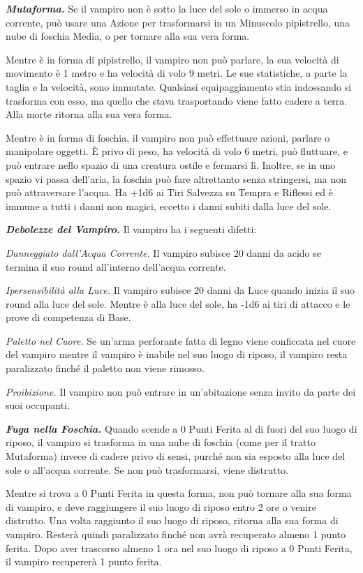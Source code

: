 \begin{multicols}{2}
{\emph{\textbf{Mutaforma.}} Se il vampiro non è sotto la luce del sole o immerso in acqua corrente, può usare una Azione per trasformarsi in un Minuscolo pipistrello, una nube di foschia Media, o per tornare alla sua vera forma.

Mentre è in forma di pipistrello, il vampiro non può parlare, la sua velocità di movimento è 1 metro e ha velocità di volo 9 metri. Le sue statistiche, a parte la taglia e la velocità, sono immutate. Qualsiasi equipaggiamento stia indossando si trasforma con esso, ma quello che stava trasportando viene fatto cadere a terra. Alla morte ritorna alla sua vera forma.

Mentre è in forma di foschia, il vampiro non può effettuare azioni, parlare o manipolare oggetti. È privo di peso, ha velocità di volo 6 metri, può fluttuare, e può entrare nello spazio di una creatura ostile e fermarsi lì. Inoltre, se in uno spazio vi passa dell'aria, la foschia può fare altrettanto senza stringersi, ma non può attraversare l'acqua. Ha +1d6 ai Tiri Salvezza su Tempra e Riflessi ed è immune a tutti i danni non magici, eccetto i danni subiti dalla luce del
sole.

\emph{\textbf{Debolezze del Vampiro.}} Il vampiro ha i seguenti difetti:

\emph{Danneggiato dall'Acqua Corrente.} Il vampiro subisce 20 danni da acido se termina il suo round all'interno dell'acqua corrente.

\emph{Ipersensibilità alla Luce.} Il vampiro subisce 20 danni da Luce quando inizia il suo round alla luce del sole. Mentre è alla luce del sole, ha -1d6 ai tiri di attacco e le prove di competenza di Base.

\emph{Paletto nel Cuore.} Se un'arma perforante fatta di legno viene conficcata nel cuore del vampiro mentre il vampiro è inabile nel suo luogo di riposo, il vampiro resta paralizzato finché il paletto non viene rimosso.

\emph{Proibizione.} Il vampiro non può entrare in un'abitazione senza invito da parte dei suoi occupanti.

\emph{\textbf{Fuga nella Foschia.}} Quando scende a 0 Punti Ferita al di fuori del suo luogo di riposo, il vampiro si trasforma in una nube di foschia (come per il tratto Mutaforma) invece di cadere privo di sensi, purché non sia esposto alla luce del sole o all'acqua corrente. Se non può trasformarsi, viene distrutto.

Mentre si trova a 0 Punti Ferita in questa forma, non può tornare alla sua forma di vampiro, e deve raggiungere il suo luogo di riposo entro 2 ore o venire distrutto. Una volta raggiunto il suo luogo di riposo, ritorna alla sua forma di vampiro. Resterà quindi paralizzato finché non avrà recuperato almeno 1 punto ferita. Dopo aver trascorso almeno 1 ora nel suo luogo di riposo a 0 Punti Ferita, il vampiro recupererà 1 punto ferita.

}
\end{multicols}
